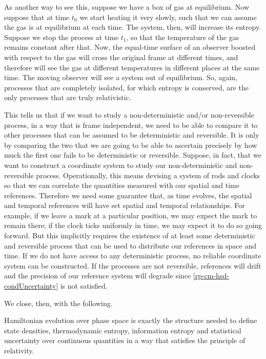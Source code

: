 As another way to see this, suppose we have a box of gas at equilibrium. Now suppose that at time $t_0$ we start heating it very slowly, such that we can assume the gas is at equilibrium at each time. The system, then, will increase its entropy. Suppose we stop the process at time $t_1$, so that the temperature of the gas remains constant after that. Now, the equal-time surface of an observer boosted with respect to the gas will cross the original frame at different times, and therefore will see the gas at different temperatures in different places at the same time. The moving observer will see a system out of equilibrium. So, again, processes that are completely isolated, for which entropy is conserved, are the only processes that are truly relativistic.

This tells us that if we want to study a non-deterministic and/or non-reversible process, in a way that is frame independent, we need to be able to compare it to other processes that can be assumed to be deterministic and reversible. It is only by comparing the two that we are going to be able to ascertain precisely by how much the first one fails to be deterministic or reversible. Suppose, in fact, that we want to construct a coordinate system to study our non-deterministic and non-reversible process. Operationally, this means devising a system of rods and clocks so that we can correlate the quantities measured with our spatial and time references. Therefore we need some guarantee that, as time evolves, the spatial and temporal references will have set spatial and temporal relationships. For example, if we leave a mark at a particular position, we may expect the mark to remain there; if the clock ticks uniformly in time, we may expect it to do so going forward. But this implicitly requires the existence of at least some deterministic and reversible process that can be used to distribute our references in space and time. If we do not have access to any deterministic process, no reliable coordinate system can be constructed. If the processes are not reversible, references will drift and the precision of our reference system will degrade since \ref{rp-cm-hsd-condUncertainty} is not satisfied.

We close, then, with the following.
\begin{insight}
	Hamiltonian evolution over phase space is exactly the structure needed to define state densities, thermodynamic entropy, information entropy and statistical uncertainty over continuous quantities in a way that satisfies the principle of relativity.
\end{insight}

